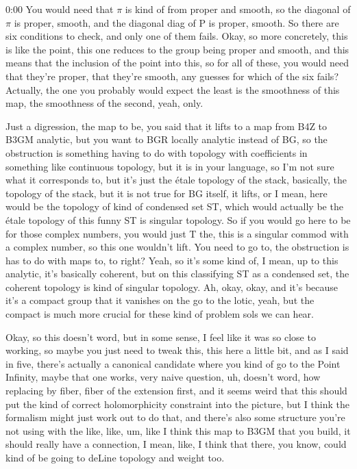 \begin{unfinished}{0:00}
You would need that $\pi$ is kind of from proper and smooth, so the diagonal of $\pi$ is proper, smooth, and the diagonal diag of P is proper, smooth. So there are six conditions to check, and only one of them fails. Okay, so more concretely, this is like the point, this one reduces to the group being proper and smooth, and this means that the inclusion of the point into this, so for all of these, you would need that they're proper, that they're smooth, any guesses for which of the six fails? Actually, the one you probably would expect the least is the smoothness of this map, the smoothness of the second, yeah, only.

Just a digression, the map to be, you said that it lifts to a map from B4Z to B3GM analytic, but you want to BGR locally analytic instead of BG, so the obstruction is something having to do with topology with coefficients in something like continuous topology, but it is in your language, so I'm not sure what it corresponds to, but it's just the étale topology of the stack, basically, the topology of the stack, but it is not true for BG itself, it lifts, or I mean, here would be the topology of kind of condensed set ST, which would actually be the étale topology of this funny ST is singular topology. So if you would go here to be for those complex numbers, you would just T the, this is a singular commod with a complex number, so this one wouldn't lift. You need to go to, the obstruction is has to do with maps to, to right? Yeah, so it's some kind of, I mean, up to this analytic, it's basically coherent, but on this classifying ST as a condensed set, the coherent topology is kind of singular topology. Ah, okay, okay, and it's because it's a compact group that it vanishes on the go to the lotic, yeah, but the compact is much more crucial for these kind of problem sols we can hear.

Okay, so this doesn't word, but in some sense, I feel like it was so close to working, so maybe you just need to tweak this, this here a little bit, and as I said in five, there's actually a canonical candidate where you kind of go to the Point Infinity, maybe that one works, very naive question, uh, doesn't word, how replacing by fiber, fiber of the extension first, and it seems weird that this should put the kind of correct holomorphicity constraint into the picture, but I think the formalism might just work out to do that, and there's also some structure you're not using with the like, like, um, like I think this map to B3GM that you build, it should really have a connection, I mean, like, I think that there, you know, could kind of be going to deLine topology and weight too.


\end{unfinished}
